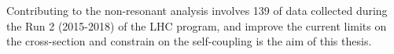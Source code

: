 Contributing to the \HHyybb non-resonant analysis involves 139 \ifb of data collected during the Run 2 (2015-2018) of the LHC program, and improve the current limits on the cross-section and constrain on the self-coupling is the aim of this thesis. 




